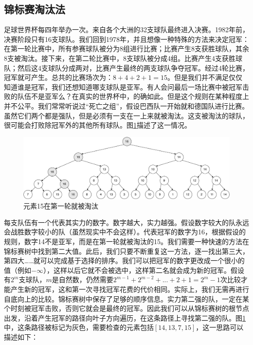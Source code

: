 \documentclass[b5paper]{ctexart}
\begin{document}
\subsection{锦标赛淘汰法}

足球世界杯每四年举办一次。来自各个大洲的32支球队最终进入决赛。1982年前，决赛阶段只有16支球队。我们回到1978年，并且想像一种特殊的方法来决定冠军：在第一轮比赛中，所有参赛球队被分为8组进行比赛；比赛产生8支获胜球队，其余8支被淘汰。接下来，在第二轮比赛中，8支球队被分成4组。比赛产生4支获胜球队；然后这4支球队分成两对，比赛产生最终的两支球队争夺冠军。经过4轮比赛，冠军就可产生。总共的比赛场次为：$8+4+2+1 = 15$。但是我们并不满足仅仅知道谁是冠军，我们还想知道哪支球队是亚军。有人会问最后一场比赛中被冠军击败的队伍不是亚军么？在真实的世界杯中，的确如此。但是这个规则在某种程度上并不公平。我们常常听说过“死亡之组”，假设巴西队一开始就和德国队进行比赛。虽然它们两个都是强队，但是必须有一支在一上来就被淘汰。这支被淘汰的球队，很可能会打败除冠军外的其他所有球队。图\ref{fig:tournament-tree-1}描述了这一情况。

\begin{figure}[htbp]
  \centering
  \includegraphics[scale=0.28]{img/tournament-tree-1}
  \caption{元素15在第一轮就被淘汰}
  \label{fig:tournament-tree-1}
\end{figure}

每支队伍有一个代表其实力的数字。数字越大，实力越强。假设数字较大的队永远会战胜数字较小的队（虽然现实中不会这样）。代表冠军的数字为16，根据假设的规则，数字14不是亚军，而是在第一轮就被淘汰的15。我们需要一种快速的方法在锦标赛树中找到第二大值。此后，我们只要不断重复这一方法，逐一找出第三大，第四大……就可以完成基于选择的排序。我们可以把冠军的数字更改成一个很小的值（例如$-\infty$），这样以后它就不会被选中，这样第二名就会成为新的冠军。假设有$2^m$支球队，$m$是自然数，仍然需要$2^{m-1} + 2^{m-2} + ... + 2 + 1 = 2^m-1$次比较才能产生新的冠军，这和第一次寻找冠军花费的代价相同。实际上，我们无需再进行自底向上的比较。锦标赛树中保存了足够的顺序信息。实力第二强的队，一定在某个时刻被冠军击败，否则它就会是最终的冠军。因此我们可以从锦标赛树的根节点出发，沿着产生冠军的路径向叶子方向遍历，在这条路径上寻找第二强的队。图\ref{fig:tournament-tree-1}中，这条路径被标记为灰色，需要检查的元素包括$[14, 13, 7, 15]$，这一思路可以描述如下：
\end{document}
